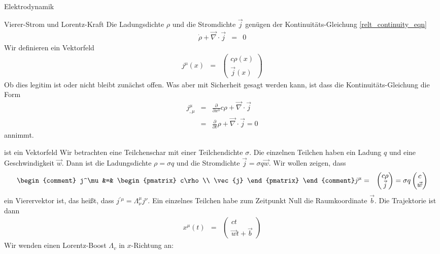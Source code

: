 \begin{chapter}{\titlestr}
\begin{section}{Elektrodynamik}
\begin{subsection}{Vierer-Strom und Lorentz-Kraft}
Die Ladungsdichte $\rho$ und die Stromdichte $\vec{j}$ genügen der Kontinuitäts-Gleichung \ref{relt_continuity_eqn}
\begin{eqnarray*}
\dot{\rho}+\vec{\nabla}\cdot \vec{j} &=& 0
\end{eqnarray*}
Wir definieren ein Vektorfeld
\begin{eqnarray*}
j^\mu(x) &=& \begin{pmatrix}
c\rho(x) \\\vec{j} (x)
\end{pmatrix}
\end{eqnarray*}
Ob dies legitim ist oder nicht bleibt zunächst offen. Was aber mit Sicherheit gesagt werden kann, ist dass die 
Kontinuitäts-Gleichung die Form
\begin{eqnarray*}
j^\mu_{,\mu} &=& \frac{\partial}{\partial x^0} c\rho+\vec{\nabla}\cdot\vec{j}\\
&=& \frac{\partial}{\partial t} \rho+\vec{\nabla}\cdot\vec{j}=0
\end{eqnarray*}
annimmt.
\begin{subsubsection}{ ist ein Vektorfeld}
Wir betrachten eine Teilchenschar mit einer Teilchendichte $\sigma$. Die einzelnen Teilchen haben ein Ladung $q$
und eine Geschwindigkeit $\vec{w}$. Dann ist die Ladungsdichte $\rho=\sigma q$ und die Stromdichte $\vec{j}=\sigma q \vec{w}$.
Wir wollen zeigen, dass
\begin{eqnarray*}
\begin{comment}
j^\mu &=& \begin{pmatrix}
c\rho\\ \vec{j}
\end{pmatrix}
\end{comment}
j^\mu &=& \pmat{
c\rho\\ \vec{j}
}
=\sigma q\pmat{
c\\ \vec{w}
}
\end{eqnarray*}
ein Vierervektor ist, das heißt, dass $j^{\prime\mu}=\Lambda^\mu_\nu j^\nu$.
Ein einzelnes Teilchen habe zum Zeitpunkt Null die Raumkoordinate $\vec{b}$. Die Trajektorie ist dann
\begin{eqnarray*}
x^\mu(t) &=& \begin{pmatrix}
ct\\ \vec{w}t+\vec{b}
\end{pmatrix}
\end{eqnarray*}
Wir wenden einen Lorentz-Boost $\Lambda_v$ in $x$-Richtung an:

\end{subsubsection}
\end{subsection}
\end{section}
\end{chapter}
